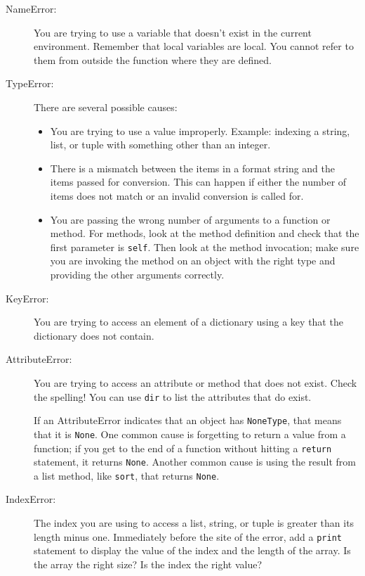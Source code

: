 \documentclass[10pt]{book}
\begin{document}
\begin{description}

\item[NameError:]  You are trying to use a variable that doesn't
exist in the current environment.
Remember that local variables are local.  You
cannot refer to them from outside the function where they are defined.

\item[TypeError:] There are several possible causes:

\begin{itemize}

\item  You are trying to use a value improperly.  Example: indexing
a string, list, or tuple with something other than an integer.

\item There is a mismatch between the items in a format string and
the items passed for conversion.  This can happen if either the number
of items does not match or an invalid conversion is called for.

\item You are passing the wrong number of arguments to a function or method.
For methods, look at the method definition and
check that the first parameter is {\tt self}.  Then look at the
method invocation; make sure you are invoking the method on an
object with the right type and providing the other arguments
correctly.

\end{itemize}

\item[KeyError:]  You are trying to access an element of a dictionary
using a key that the dictionary does not contain.

\item[AttributeError:] You are trying to access an attribute or method
that does not exist.  Check the spelling!  You can use
{\tt dir} to list the attributes that do exist.

If an AttributeError indicates that an object has {\tt NoneType},
that means that it is {\tt None}.  One common cause is forgetting
to return a value from a function; if you get to the end of
a function without hitting a {\tt return} statement, it returns
{\tt None}.  Another common cause is using the result from
a list method, like {\tt sort}, that returns {\tt None}.

\item[IndexError:] The index you are using
to access a list, string, or tuple is greater than
its length minus one.  Immediately before the site of the error,
add a {\tt print} statement to display
the value of the index and the length of the array.
Is the array the right size?  Is the index the right value?

\end{description}
\end{document}
